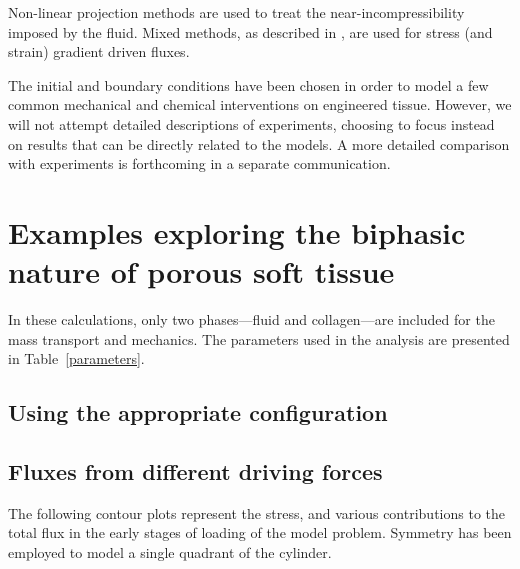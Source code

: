 Non-linear projection methods \citep{simotaylorpister:85} are used to treat the
near-incompressibility imposed by the fluid. Mixed methods, as described
in \cite{Garikipatiox2:01}, are used for stress (and strain) gradient
driven fluxes.

The initial and boundary
conditions have been chosen in order to model a few common mechanical and
chemical interventions on engineered tissue. However, we will not
attempt detailed descriptions of experiments, choosing to focus
instead on results that can be directly related to the models. A more
detailed comparison with experiments is forthcoming in a separate
communication.

\section{Examples exploring the biphasic nature of porous soft tissue}
\label{biphasic-examples-1}

In these calculations, only two phases---fluid and collagen---are
included for the mass transport and mechanics. The parameters used in the analysis
are presented in Table~\ref{parameters}. 


\subsection{Using the appropriate configuration}
\label{appropriate-configuration}


\subsection{Fluxes from different driving forces}
\label{flux-driving-forces}

The following contour plots represent the stress, and various
contributions to the total flux in the early stages of loading of
the model problem. Symmetry has been employed to model a single
quadrant of the cylinder.


